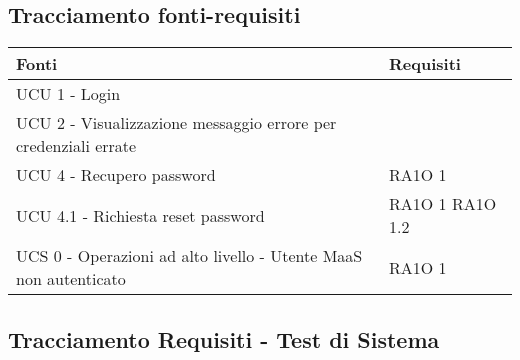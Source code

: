 \subsection{Tracciamento fonti-requisiti}
      \begin{center}
      \bgroup
      \def\arraystretch{1.8}
      \begin{longtable}{ | p{5cm} | p{5cm} |}
    
      \cellcolor[gray]{0.9} \textbf{Fonti} & \cellcolor[gray]{0.9} \textbf{Requisiti} \\ \hline       
            UCU 1 - Login &  \\ \hline      
            UCU 2 - Visualizzazione messaggio errore per credenziali errate &  \\ \hline      
            UCU 4 - Recupero password &  RA1O 1 \newline  \\ \hline      
            UCU 4.1 - Richiesta reset password &  RA1O 1 \newline  RA1O 1.2 \newline  \\ \hline      
            UCS 0 - Operazioni ad alto livello - Utente MaaS non autenticato &  RA1O 1 \newline  \\ \hline     
      \end{longtable}
      \egroup
      \end{center}  
\clearpage
\subsection{Tracciamento Requisiti - Test di Sistema}

